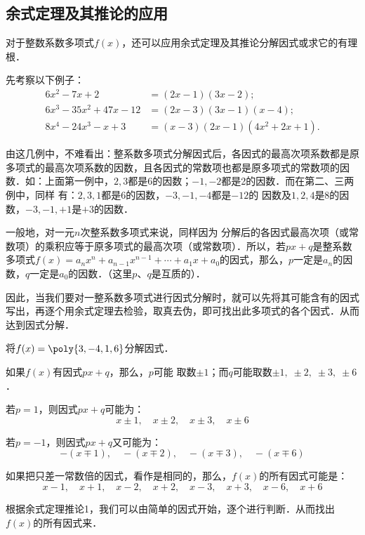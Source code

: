 \subsection{余式定理及其推论的应用}
对于整数系数多项式$f(x)$，还可以应用余式定理及其推论分解因式或求它的有理根．

先考察以下例子：
\[\begin{split}
    6x^2-7x+2&= (2x-1) (3x-2);\\
6x^3-35x^2+47x-12&= (2x-3) (3x-1)(x-4);\\
8x^4-24x^3-x+3&= (x-3) (2x-1)(4x^2+2x+1) .
\end{split}\]

由这几例中，不难看出：整系数多项式分解因式后，各因式的最高次项系数都是原多项式的最高次项系数的因数，且各因式的常数项也都是原多项式的常数项的因数．如：上面第一例中，$2, 3$都是6的因数；$-1,-2$都是2的因数．而在第二、三两例中，同样
有：$2, 3, 1$都是6的因数，$-3,-1,-4$都是$-12$的
因数及$1, 2, 4$是8的因数，$-3,-1,+1$是$+3$的因数．

一般地，对一元$n$次整系数多项式来说，同样因为
分解后的各因式最高次项（或常数项）的乘积应等于原多项式的最高次项（或常数项）．所以，若$px+q$是整系数多项式$f(x)=a_nx^n+a_{n-1}x^{n-1}+\cdots +a_1x+a_0$的因式，那么，$p$一定是$a_n$的因数，$q$一定是$a_0$的因数．（这里$p$、$q$是互质的）．

因此，当我们要对一整系数多项式进行因式分解时，就可以先将其可能含有的因式写出，再逐个用余式定理去检验，取真去伪，即可找出此多项式的各个因式．从而达到因式分解．


\begin{example}
    将$f(x)=\poly{3,-4,1,6}$分解因式．
\end{example}

\begin{analyze}
    如果$f(x)$有因式$px+q$，那么，$p$可能
取数$\pm1$；而$q$可能取数$\pm1,\;\pm2,\;\pm3,\;\pm6$．

若$p=1$，则因式$px+q$可能为：
\[x\pm1,\quad x\pm2,\quad x\pm3,\quad x\pm6\]

若$p=-1$，则因式$px+q$又可能为：
\[- (x\mp 1) ,\quad - (x\mp 2) ,\quad - (x\mp 3) ,\quad -(x\mp 6)\]

如果把只差一常数倍的因式，看作是相同的，那么，$f(x)$的所有因式可能是：
\[x-1,\quad x+1, \quad x-2,\quad x+2,\quad x-3,\quad x+3,\quad x-6,\quad x+6\]

根据余式定理推论1，我们可以由简单的因式开始，逐个进行判断．从而找出$f(x)$的所有因式来．    
\end{analyze}


